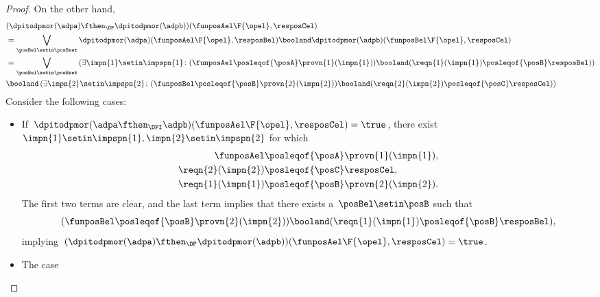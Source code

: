\begin{proof}
    On the other hand,
    \begin{equation}
        \label{eq:dpitodp_b}
        \begin{aligned}
             & (\dpitodpmor(\adpa) \fthen_\DP \dpitodpmor(\adpb))(\funposAel\F{\opel},\resposCel) \\
             & =\bigvee_{\posBel \setin \posBset}\dpitodpmor(\adpa)(\funposAel\F{\opel},\resposBel)\booland \dpitodpmor(\adpb)(\funposBel\F{\opel},\resposCel) \\
             & =\bigvee_{\posBel \setin \posBset} \left({\exists \impn{1} \setin \impspn{1}\colon (\funposAel \posleqof{\posA}\provn{1}(\impn{1}))\booland (\reqn{1}(\impn{1})\posleqof{\posB} \resposBel)}\right) \\
             & \booland \left({\exists \impn{2} \setin \impspn{2}\colon (\funposBel \posleqof{\posB}\provn{2}(\impn{2}))\booland (\reqn{2}(\impn{2})\posleqof{\posC} \resposCel)}\right)
        \end{aligned}
    \end{equation}
    Consider the following cases:
    \begin{itemize}
        \item If~$\dpitodpmor(\adpa \fthen_\DPI \adpb)(\funposAel\F{\opel},\resposCel)=\true$, there exist~$\impn{1}\setin \impspn{1},\impn{2}\setin \impspn{2}$ for which
              \begin{equation}
                  \begin{aligned}
                      \funposAel         & \posleqof{\posA}\provn{1}(\impn{1}), \\
                      \reqn{2}(\impn{2}) & \posleqof{\posC} \resposCel, \\
                      \reqn{1}(\impn{1}) & \posleqof{\posB}\provn{2}(\impn{2}).
                  \end{aligned}
              \end{equation}
              The first two terms are clear, and the last term implies that there exists a~$\posBel\setin \posB$ such that
              \begin{equation}
                  (\funposBel\posleqof{\posB}\provn{2}(\impn{2}))
                  \booland (\reqn{1}(\impn{1})\posleqof{\posB}\resposBel),
              \end{equation}
              implying~$(\dpitodpmor(\adpa) \fthen_\DP \dpitodpmor(\adpb))(\funposAel\F{\opel},\resposCel)=\true$.
        \item The case
              \begin{equation}

\end{equation}
\end{itemize}
\end{proof}
